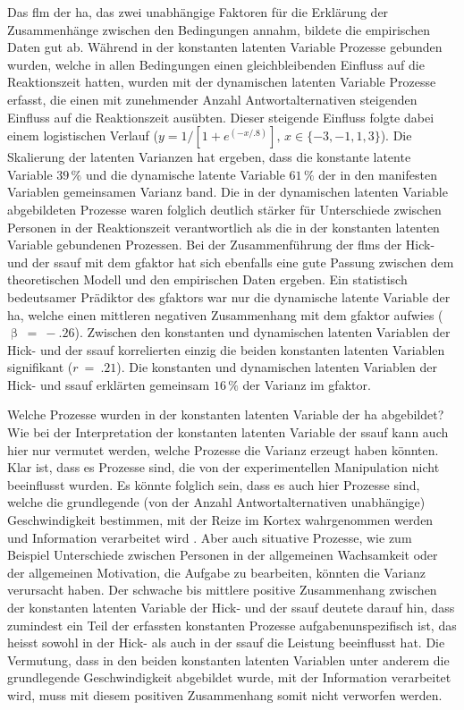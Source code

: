 \documentclass[11pt, twoside, a4paper]{book}		%
\begin{document}

Das \gls{flm} der \gls{ha}, das zwei unabhängige Faktoren für die Erklärung der Zusammenhänge zwischen den Bedingungen annahm, bildete die empirischen Daten gut ab. 
Während in der konstanten latenten Variable Prozesse gebunden wurden, welche in allen Bedingungen einen gleichbleibenden Einfluss auf die Reaktionszeit hatten, wurden mit der dynamischen latenten Variable Prozesse erfasst, die einen mit zunehmender Anzahl Antwortalternativen steigenden Einfluss auf die Reaktionszeit ausübten. Dieser steigende Einfluss folgte dabei einem logistischen Verlauf ($y={1}/[{1 + e^{(-x/.8)}}],\,x\in\{-3,-1,1,3\}$).
Die Skalierung der latenten Varianzen hat ergeben, dass die konstante latente Variable $39\,\%$ und die dynamische latente Variable $61\,\%$ der in den manifesten Variablen gemeinsamen Varianz band. 
Die in der dynamischen latenten Variable abgebildeten Prozesse waren folglich deutlich stärker für Unterschiede zwischen Personen in der Reaktionszeit verantwortlich als die in der konstanten latenten Variable gebundenen Prozessen.
Bei der Zusammenführung der \glspl{flm} der Hick- und der \gls{ssauf} mit dem \gls{gfaktor} hat sich ebenfalls eine gute Passung zwischen dem theoretischen Modell und den empirischen Daten ergeben. Ein statistisch bedeutsamer Prädiktor des \gls{gfaktor}s war nur die dynamische latente Variable der \gls{ha}, welche einen mittleren negativen Zusammenhang mit dem \gls{gfaktor} aufwies ($\upbeta~=~-.26$). 
Zwischen den konstanten und dynamischen latenten Variablen der Hick- und der \gls{ssauf} korrelierten einzig die beiden konstanten latenten Variablen signifikant ($r~=~.21$). Die konstanten und dynamischen latenten Variablen der Hick- und \gls{ssauf} erklärten gemeinsam $16\,\%$ der Varianz im \gls{gfaktor}.

Welche Prozesse wurden in der konstanten latenten Variable der \gls{ha} abgebildet?
Wie bei der Interpretation der konstanten latenten Variable der \gls{ssauf} kann auch hier nur vermutet werden, welche Prozesse die Varianz erzeugt haben könnten. Klar ist, dass es Prozesse sind, die von der experimentellen Manipulation nicht beeinflusst wurden. Es könnte folglich sein, dass es auch hier Prozesse sind, welche die grundlegende (von der Anzahl Antwortalternativen unabhängige) Geschwindigkeit bestimmen, mit der Reize im Kortex wahrgenommen werden \citep{Jensen1998b} und Information verarbeitet wird \citep{Schweizer2007, Stauffer2014}. Aber auch situative Prozesse, wie zum Beispiel Unterschiede zwischen Personen in der allgemeinen Wachsamkeit oder der allgemeinen Motivation, die Aufgabe zu bearbeiten, könnten die Varianz verursacht haben.
Der schwache bis mittlere positive Zusammenhang zwischen der konstanten latenten Variable der Hick- und der \gls{ssauf} deutete darauf hin, dass zumindest ein Teil der erfassten konstanten Prozesse aufgabenunspezifisch ist, das heisst sowohl in der Hick- als auch in der \gls{ssauf} die Leistung beeinflusst hat. Die Vermutung, dass in den beiden konstanten latenten Variablen unter anderem die grundlegende Geschwindigkeit abgebildet wurde, mit der Information verarbeitet wird, muss mit diesem positiven Zusammenhang somit nicht verworfen werden. 
\end{document}
